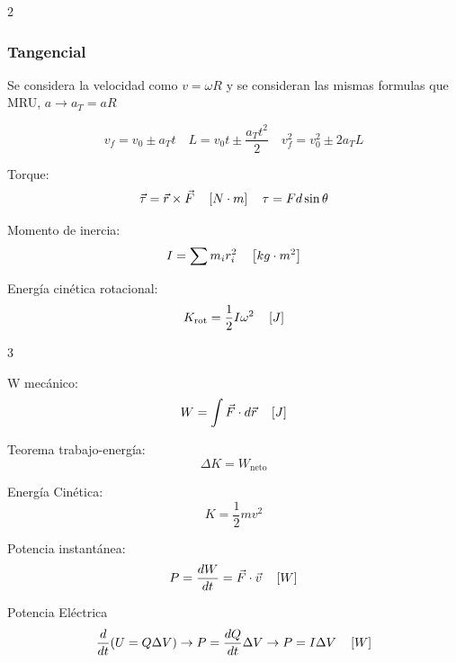 \documentclass{article}
\begin{document}
\begin{multicols}{2}
                            \subsubsection*{Tangencial}
                            Se considera la velocidad como $v=\omega R$ y se consideran las mismas formulas que MRU, $a\to a_T=aR$

                            $$v_f = v_0 \pm a_T t \quad
                            L = v_0 t \pm \dfrac{a_T t^2}{2} \quad
                            v_f^2 = v_0^2 \pm 2a_T L$$


                            \begin{itemform}
                            \item Torque:
                              $$\vec{\tau} = \vec{r}\times\vec{F} \quad \left[N\cdot m \right] \quad \tau=Fd\sin \theta$$
                            \item Momento de inercia:
                              $$I = \sum m_i r_i^2 \quad \left[kg\cdot m^2 \right]$$
                            \item Energía cinética rotacional:
                              $$K_{\text{rot}} = \frac{1}{2}I\omega^2 \quad \left[J \right]$$

                            \end{itemform}

                            \begin{multicols}{3}
                                \begin{itemform}
                            \item W mecánico:
                              $$W = \int \vec{F}\cdot d\vec{r} \quad \left[J \right]$$
                            \item Teorema trabajo-energía:
                              $$\Delta K = W_{\text{neto}}$$
                            \item Energía Cinética:
                              $$K=\dfrac{1}{2}mv^2$$

                                \end{itemform}
                            \end{multicols}
                            \begin{itemform}
                            \item Potencia instantánea:
                              $$P = \frac{dW}{dt} = \vec{F}\cdot\vec{v} \quad \left[W \right]$$
                            \item Potencia Eléctrica
                              $$\dfrac{d}{dt}(U=Q\Delta V) \rightarrow P=\dfrac{dQ}{dt}\Delta V  \rightarrow P=I\Delta V \quad \left[W \right]$$
                            \end{itemform}

                            \end{multicols}
\end{document}
